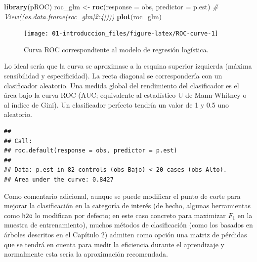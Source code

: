 \documentclass[]{book}
\newenvironment{Shaded}{\begin{snugshade}}{\end{snugshade}}
\newcommand{\KeywordTok}[1]{\textcolor[rgb]{0.13,0.29,0.53}{\textbf{#1}}}
\newcommand{\DataTypeTok}[1]{\textcolor[rgb]{0.13,0.29,0.53}{#1}}
\newcommand{\StringTok}[1]{\textcolor[rgb]{0.31,0.60,0.02}{#1}}
\newcommand{\CommentTok}[1]{\textcolor[rgb]{0.56,0.35,0.01}{\textit{#1}}}
\newcommand{\NormalTok}[1]{#1}
\theoremstyle{break}
\theoremstyle{definition}
\theoremstyle{definition}
\theoremstyle{definition}
\theoremstyle{remark}
\begin{document}
\begin{Shaded}
\begin{Highlighting}[]
\KeywordTok{library}\NormalTok{(pROC)}
\NormalTok{roc_glm <-}\StringTok{ }\KeywordTok{roc}\NormalTok{(}\DataTypeTok{response =}\NormalTok{ obs, }\DataTypeTok{predictor =}\NormalTok{ p.est)}
\CommentTok{# View((as.data.frame(roc_glm[2:4])))}
\KeywordTok{plot}\NormalTok{(roc_glm)}
\end{Highlighting}
\end{Shaded}

\begin{figure}[!htb]

{\centering \texttt{[image: 01-introduccion\_files/figure-latex/ROC-curve-1]} 

}

\caption{Curva ROC correspondiente al modelo de regresión logística.}\label{fig:ROC-curve}
\end{figure}

Lo ideal sería que la curva se aproximase a la esquina superior
izquierda (máxima sensibilidad y especificidad). La recta diagonal se
correspondería con un clasificador aleatorio. Una medida global del
rendimiento del clasificador es el área bajo la curva ROC (AUC;
equivalente al estadístico U de Mann-Whitney o al índice de Gini). Un
clasificador perfecto tendría un valor de 1 y 0.5 uno aleatorio.

\begin{Shaded}
\end{Shaded}

\begin{verbatim}
## 
## Call:
## roc.default(response = obs, predictor = p.est)
## 
## Data: p.est in 82 controls (obs Bajo) < 20 cases (obs Alto).
## Area under the curve: 0.8427
\end{verbatim}

Como comentario adicional, aunque se puede modificar el punto de corte
para mejorar la clasificación en la categoría de interés (de hecho,
algunas herramientas como \texttt{h2o} lo modifican por defecto; en este
caso concreto para maximizar \(F_1\) en la muestra de entrenamiento),
muchos métodos de clasificación (como los basados en árboles descritos
en el Capítulo 2) admiten como opción una matriz de pérdidas que se
tendrá en cuenta para medir la eficiencia durante el aprendizaje y
normalmente esta sería la aproximación recomendada.
\end{document}
